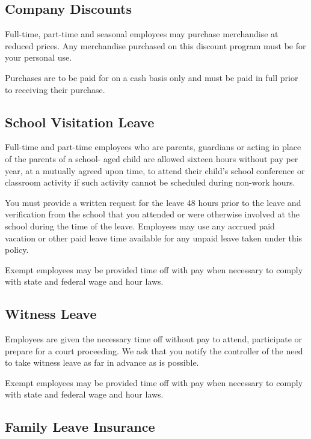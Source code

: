 \subsection{Company Discounts}

Full-time, part-time and seasonal employees may purchase merchandise at reduced prices. Any merchandise purchased on this discount program must be for your personal use.

Purchases are to be paid for on a cash basis only and must be paid in full prior to receiving their purchase.

\subsection{School Visitation Leave}

Full-time and part-time employees who are parents, guardians or acting in place of the parents of a school- aged child are allowed sixteen hours without pay per year, at a mutually agreed upon time, to attend their child's school conference or classroom activity if such activity cannot be scheduled during non-work hours.

You must provide a written request for the leave 48 hours prior to the leave and verification from the school that you attended or were otherwise involved at the school during the time of the leave. Employees may use any accrued paid vacation or other paid leave time available for any unpaid leave taken under this policy.

Exempt employees may be provided time off with pay when necessary to comply with state and federal wage and hour laws.

\subsection{Witness Leave}

Employees are given the necessary time off without pay to attend, participate or prepare for a court proceeding. We ask that you notify the controller of the need to take witness leave as far in advance as is possible.

Exempt employees may be provided time off with pay when necessary to comply with state and federal wage and hour laws.

\subsection{Family Leave Insurance}

